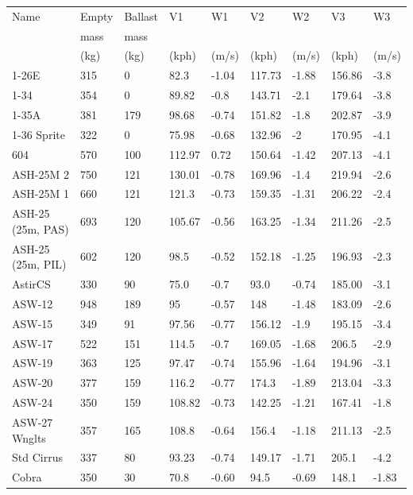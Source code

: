 \documentclass[a4paper,12pt]{refrep}
\begin{document}
\begin{maxipage}
\begin{small}
\begin{longtable}{l l l l l l l l l}
\toprule
Name & Empty & Ballast & V1 & W1 & V2 & W2 & V3 & W3 \\
     & mass       & mass         &  &  &  &  &  &  \\
     & (kg)       & (kg)         & (kph) & (m/s) & (kph) & (m/s) & (kph) & (m/s) \\
\midrule
1-26E & 315 & 0 & 82.3 & -1.04 & 117.73 & -1.88 & 156.86 & -3.8 \\
1-34 & 354 & 0 & 89.82 & -0.8 & 143.71 & -2.1 & 179.64 & -3.8 \\
1-35A & 381 & 179 & 98.68 & -0.74 & 151.82 & -1.8 & 202.87 & -3.9 \\
1-36 Sprite & 322 & 0 & 75.98 & -0.68 & 132.96 & -2 & 170.95 & -4.1 \\
604 & 570 & 100 & 112.97 & 0.72 & 150.64 & -1.42 & 207.13 & -4.1 \\
ASH-25M 2 & 750 & 121 & 130.01 & -0.78 & 169.96 & -1.4 & 219.94 & -2.6 \\
ASH-25M 1 & 660 & 121 & 121.3 & -0.73 & 159.35 & -1.31 & 206.22 & -2.4 \\
ASH-25 (25m, PAS) & 693 & 120 & 105.67 & -0.56 & 163.25 & -1.34 & 211.26 & -2.5 \\
ASH-25 (25m, PIL) & 602 & 120 & 98.5 & -0.52 & 152.18 & -1.25 & 196.93 & -2.3 \\
AstirCS & 330 & 90 & 75.0 & -0.7 & 93.0 & -0.74 & 185.00 & -3.1 \\
ASW-12 & 948 & 189 & 95 & -0.57 & 148 & -1.48 & 183.09 & -2.6 \\
ASW-15 & 349 & 91 & 97.56 & -0.77 & 156.12 & -1.9 & 195.15 & -3.4 \\
ASW-17 & 522 & 151 & 114.5 & -0.7 & 169.05 & -1.68 & 206.5 & -2.9 \\
ASW-19 & 363 & 125 & 97.47 & -0.74 & 155.96 & -1.64 & 194.96 & -3.1 \\
ASW-20 & 377 & 159 & 116.2 & -0.77 & 174.3 & -1.89 & 213.04 & -3.3 \\
ASW-24 & 350 & 159 & 108.82 & -0.73 & 142.25 & -1.21 & 167.41 & -1.8 \\
ASW-27 Wnglts & 357 & 165 & 108.8 & -0.64 & 156.4 & -1.18 & 211.13 & -2.5 \\
Std Cirrus & 337 & 80 & 93.23 & -0.74 & 149.17 & -1.71 & 205.1 & -4.2 \\
Cobra & 350 & 30 & 70.8 & -0.60 & 94.5 & -0.69 & 148.1 & -1.83 \\

\end{longtable}
\end{small}
\end{maxipage}
\end{document}
